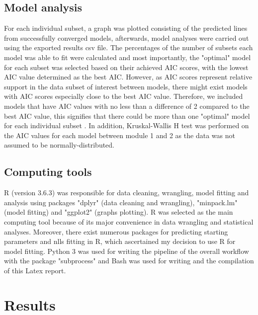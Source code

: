 \documentclass[11pt, a4paper]{article} %
\begin{document}
\subsection{Model analysis}
For each individual subset, a graph was plotted consisting of the predicted lines from successfully converged models, afterwards, model analyses were carried out using the exported results csv file. The percentages of the number of subsets each model was able to fit were calculated and most importantly, the "optimal" model for each subset was selected based on their achieved AIC scores, with the lowest AIC value determined as the best AIC. However, as AIC scores represent relative support in the data subset of interest between models, there might exist models with AIC scores especially close to the best AIC value. Therefore, we included models that have AIC values with no less than a difference of 2 compared to the best AIC value, this signifies that there could be more than one "optimal" model for each individual subset \cite{burnham2004multimodel}. In addition, Kruskal-Wallis H test was performed on the AIC values for each model between module 1 and 2 as the data was not assumed to be normally-distributed.

\subsection{Computing tools}
R (version 3.6.3) was responsible for data cleaning, wrangling, model fitting and analysis using packages "dplyr" (data cleaning and wrangling), "minpack.lm" (model fitting) and "ggplot2" (graphs plotting). R was selected as the main computing tool because of its major convenience in data wrangling and statistical analyses. Moreover, there exist numerous packages for predicting starting parameters and nlls fitting in R, which ascertained my decision to use R for model fitting. Python 3 was used for writing the pipeline of the overall workflow with the package "subprocess" and Bash was used for writing and the compilation of this Latex report. 

\section{Results}
\end{document}
